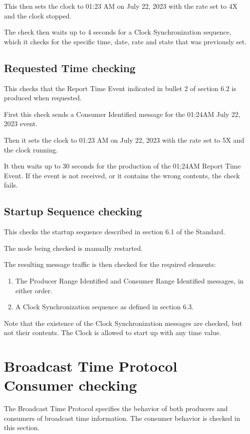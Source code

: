 This then sets the clock to 01:23 AM on July 22, 2023 with the rate set to 4X and the clock stopped.

The check then waits up to 4 seconds for a Clock Synchronization sequence, which it checks for
the specific time, date, rate and state that was previously set.

\subsection{Requested Time checking}

This checks that the Report Time Event indicated in bullet 2 of section 6.2 is 
produced when requested.

First this check sends a Consumer Identified message for the 01:24AM  July 22, 2023 event.

Then it sets the clock to 01:23 AM on July 22, 2023 with the rate set to 5X and the clock running.

It then waits up to 30 seconds for the production of the 01;24AM Report Time Event.
If the event is not received, or it contains the wrong contents, the check fails.

\subsection{Startup Sequence checking}

This checks the startup sequence described in section 6.1 of the Standard.

The node being checked is manually restarted.

The resulting message traffic is then checked for the required elements:
\begin{enumerate}
\item The Producer Range Identified and Consumer Range Identified messages, in either order.
\item A Clock Synchronization sequence as defined in section 6.3.
\end{enumerate}

Note that the existence of the Clock Synchronization messages are checked, but not 
their contents.  The Clock is allowed to start up with any time value.

\section{Broadcast Time Protocol Consumer checking}

The Broadcast Time Protocol specifies the behavior of both producers and consumers of 
broadcast time information.  
The consumer behavior is checked in this section.

